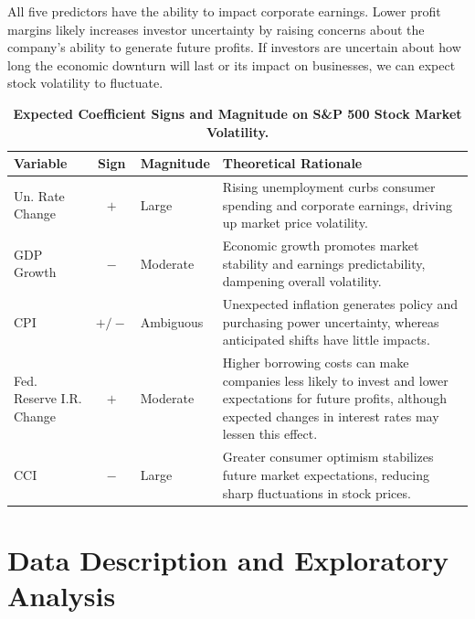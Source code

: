 \indent All five predictors have the ability to impact corporate earnings. Lower profit margins likely increases investor uncertainty by raising concerns about the company’s ability to generate future profits. If investors are uncertain about how long the economic downturn will last or its impact on businesses, we can expect stock volatility to fluctuate. 
\vspace{0.8em}
\begin{table}[htbp]
\centering
\small
\renewcommand{\arraystretch}{1.35}
\caption{\textbf{Expected Coefficient Signs and Magnitude on S\&P 500 Stock Market Volatility.}}
\label{tab:coefficient_hypotheses}
\vspace{0.8em}
\begin{tabularx}{\textwidth}{l c l X}
\toprule
\textbf{Variable} & \textbf{Sign} & \textbf{Magnitude} & \textbf{Theoretical Rationale} \\
\midrule
Un. Rate Change & $+$ & Large & Rising unemployment curbs consumer spending and corporate earnings, driving up market price volatility. \\
GDP Growth & $-$ & Moderate & Economic growth promotes market stability and earnings predictability, dampening overall volatility. \\
CPI  & $+/-$ & Ambiguous & Unexpected inflation generates policy and purchasing power uncertainty, whereas anticipated shifts have little impacts. \\
Fed. Reserve I.R. Change & $+$ & Moderate & Higher borrowing costs can make companies less likely to invest and lower expectations for future profits, although expected changes in interest rates may lessen this effect.\\
CCI & $-$ & Large & Greater consumer optimism stabilizes future market expectations, reducing sharp fluctuations in stock prices. \\
\bottomrule
    \end{tabularx}
\end{table}
\section{Data Description and Exploratory Analysis}

